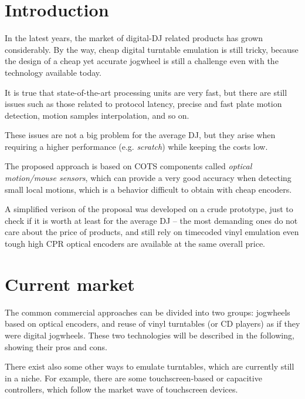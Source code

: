 \documentclass[a4paper,10pt]{article}
\begin{document}
\vspace{4ex}	%
\begin{multicols}{2}


\section{Introduction}
\label{sec:introduction}

In the latest years, the market of digital-DJ related products has grown
considerably. By the way, cheap digital turntable emulation is still tricky,
because the design of a cheap yet accurate jogwheel is still a challenge even
with the technology available today.

It is true that state-of-the-art processing units are very fast, but there are
still issues such as those related to protocol latency, precise and fast plate
motion detection, motion samples interpolation, and so on.

These issues are not a big problem for the average DJ, but they arise when
requiring a higher performance (e.g. \emph{scratch}) while keeping the costs
low.

The proposed approach is based on COTS components called \emph{optical motion/mouse
sensors}, which can provide a very good accuracy when detecting small local
motions, which is a behavior difficult to obtain with cheap encoders.

A simplified verison of the proposal was developed on a crude prototype, just
to check if it is worth at least for the average DJ -- the most demanding ones
do not care about the price of products, and still rely on timecoded vinyl
emulation even tough high CPR optical encoders are available at the same
overall price.


\section{Current market}
\label{sec:current_market}

The common commercial approaches can be divided into two groups: jogwheels
based on optical encoders, and reuse of vinyl turntables (or CD players) as if
they were digital jogwheels. These two technologies will be described in the
following, showing their pros and cons.

There exist also some other ways to emulate turntables, which are currently
still in a niche. For example, there are some touchscreen-based \cite{sm_emulator}
\cite{hn_touchosc} or capacitive \cite{stanton_scs3d} controllers, which
follow the market wave of touchscreen devices.


\end{multicols}
\end{document}
